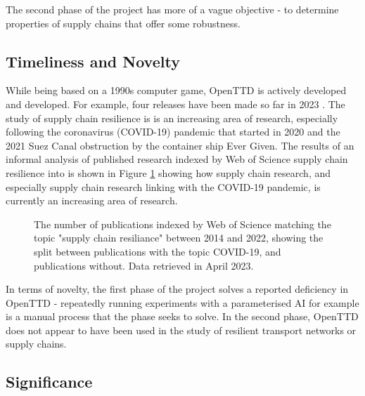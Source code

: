\documentclass[a4paper,11pt]{article}
\begin{document}
The second phase of the project has more of a vague objective - to determine properties of supply chains that offer some robustness.

\subsection{Timeliness and Novelty}

While being based on a 1990s computer game, OpenTTD is actively developed and developed. For example, four releases have been made so far in 2023 \cite{openttdReleases}. The study of supply chain resilience is is an increasing area of research, especially following the coronavirus (COVID-19) pandemic that started in 2020 and the 2021 Suez Canal obstruction by the container ship Ever Given. The results of an informal analysis of published research indexed by Web of Science supply chain resilience into is shown in Figure \ref{fig:supplychainresiliance} showing how supply chain research, and especially supply chain research linking with the COVID-19 pandemic, is currently an increasing area of research.

\begin{figure}[h]
\centering
{}
\caption{The number of publications indexed by Web of Science matching the topic "supply chain resiliance" between 2014 and 2022, showing the split between publications with the topic COVID-19, and publications without. Data retrieved in April 2023.}
\label{fig:supplychainresiliance}
\end{figure}

In terms of novelty, the first phase of the project solves a reported deficiency in OpenTTD - repeatedly running experiments with a parameterised AI for example is a manual process that the phase seeks to solve. In the second phase, OpenTTD does not appear to have been used in the study of resilient transport networks or supply chains.

\subsection{Significance}
\end{document}
